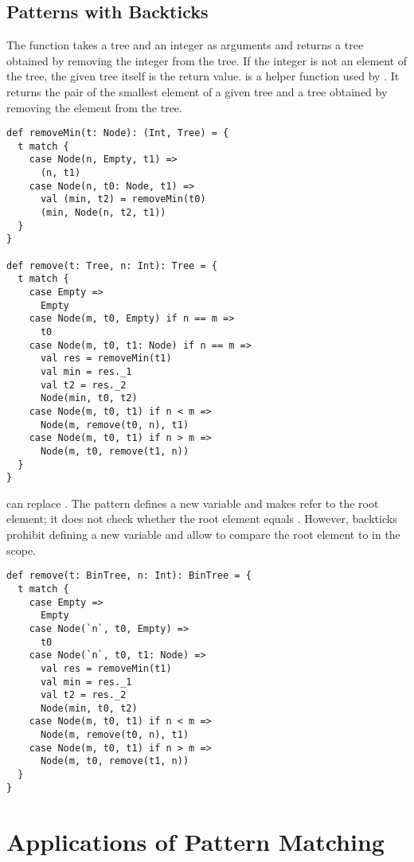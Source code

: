 \subsection{Patterns with Backticks}

The function  takes a tree and an integer as arguments and returns a
tree obtained by removing the integer from the tree. If the integer is not an
element of the tree, the given tree itself is the return value. 
is a helper function used by . It returns the pair of the smallest
element of a given tree and a tree obtained by removing the element from the
tree.

\begin{verbatim}
def removeMin(t: Node): (Int, Tree) = {
  t match {
    case Node(n, Empty, t1) =>
      (n, t1)
    case Node(n, t0: Node, t1) =>
      val (min, t2) = removeMin(t0)
      (min, Node(n, t2, t1))
  }
}

def remove(t: Tree, n: Int): Tree = {
  t match {
    case Empty =>
      Empty
    case Node(m, t0, Empty) if n == m =>
      t0
    case Node(m, t0, t1: Node) if n == m =>
      val res = removeMin(t1)
      val min = res._1
      val t2 = res._2
      Node(min, t0, t2)
    case Node(m, t0, t1) if n < m =>
      Node(m, remove(t0, n), t1)
    case Node(m, t0, t1) if n > m =>
      Node(m, t0, remove(t1, n))
  }
}
\end{verbatim}

 can replace
. The pattern  defines
a new variable  and makes  refer to the
root element; it does not check whether the root element equals .
However, backticks prohibit defining a new variable and allow to compare the root
element to  in the scope.

\begin{verbatim}
def remove(t: BinTree, n: Int): BinTree = {
  t match {
    case Empty =>
      Empty
    case Node(`n`, t0, Empty) =>
      t0
    case Node(`n`, t0, t1: Node) =>
      val res = removeMin(t1)
      val min = res._1
      val t2 = res._2
      Node(min, t0, t2)
    case Node(m, t0, t1) if n < m =>
      Node(m, remove(t0, n), t1)
    case Node(m, t0, t1) if n > m =>
      Node(m, t0, remove(t1, n))
  }
}
\end{verbatim}

\section{Applications of Pattern Matching}

